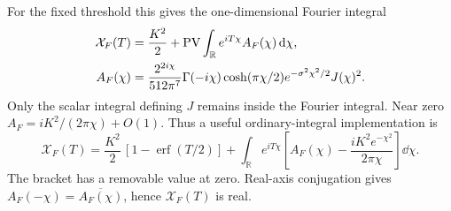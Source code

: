 For the fixed threshold this gives the one-dimensional Fourier integral
\begin{align}
 \mathcal X_F(T)&=\frac{K^2}{2}
                  +\operatorname{PV}\int_{\mathbb R}e^{iT\chi}
                         A_F(\chi)\mathop{}\!\mathrm d\chi,\notag\\
 A_F(\chi)&=\frac{2^{2i\chi}}{512\pi^7}
  \Gamma(-i\chi)\cosh(\pi\chi/2)e^{-\sigma^2\chi^2/2}J(\chi)^2.
 \label{eq:prep-fixed-Fourier}
\end{align}
Only the scalar integral defining $J$ remains inside the Fourier
integral. Near zero $A_F=iK^2/(2\pi\chi)+O(1)$. Thus a useful
ordinary-integral implementation is
\begin{equation}
 \mathcal X_F(T)=\frac{K^2}{2}\,[1-\operatorname{erf}(T/2)]
  +\int_{\mathbb R}e^{iT\chi}
    \left[A_F(\chi)-\frac{iK^2e^{-\chi^2}}{2\pi\chi}\right]\dd\chi.
 \label{eq:prep-subtracted}
\end{equation}
The bracket has a removable value at zero. Real-axis conjugation gives
$A_F(-\chi)=\overline{A_F(\chi)}$, hence $\mathcal X_F(T)$ is real.

